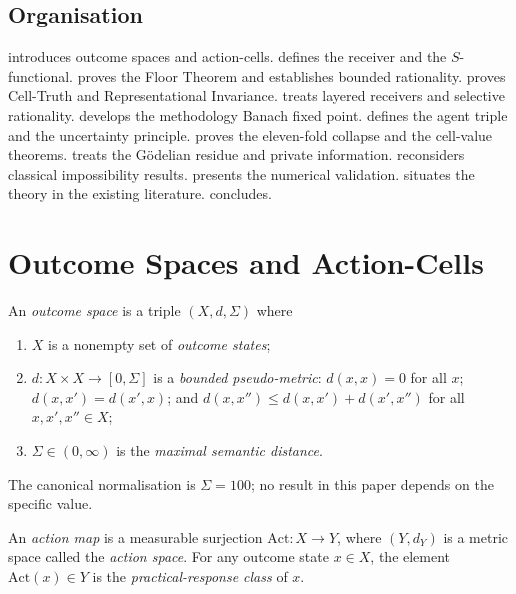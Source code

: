 \documentclass[twocolumn,11pt,a4paper]{article}
\newcommand{\Action}{\mathrm{Act}}
\begin{document}
\subsection{Organisation}
\label{sec:intro:org}

 introduces outcome spaces and action-cells.
 defines the receiver and the $S$-functional.
 proves the Floor Theorem and establishes bounded
rationality.
 proves Cell-Truth and Representational Invariance.
 treats layered receivers and selective rationality.
 develops the methodology Banach fixed point.
 defines the agent triple and the uncertainty principle.
 proves the eleven-fold collapse and the cell-value
theorems.
 treats the G\"odelian residue and private information.
 reconsiders classical impossibility results.
 presents the numerical validation.
 situates the theory in the existing literature.
 concludes.

\section{Outcome Spaces and Action-Cells}
\label{sec:outcomes}

\begin{definition}
\label{def:outcomespace}
An \emph{outcome space} is a triple $(X,d,\Sigma)$ where
\begin{enumerate}[label=(\alph*),leftmargin=*]
  \item $X$ is a nonempty set of \emph{outcome states};
  \item $d\colon X\times X\to[0,\Sigma]$ is a \emph{bounded
    pseudo-metric}: $d(x,x)=0$ for all $x$; $d(x,x')=d(x',x)$; and
    $d(x,x'')\leq d(x,x')+d(x',x'')$ for all $x,x',x''\in X$;
  \item $\Sigma\in(0,\infty)$ is the \emph{maximal semantic distance}.
\end{enumerate}
The canonical normalisation is $\Sigma=100$; no result in this paper
depends on the specific value.
\end{definition}

\begin{definition}
\label{def:actionmap}
An \emph{action map} is a measurable surjection
$\Action\colon X\to Y$, where $(Y,d_Y)$ is a metric space called the
\emph{action space}.  For any outcome state $x\in X$, the element
$\Action(x)\in Y$ is the \emph{practical-response class} of $x$.
\end{definition}
\end{document}
